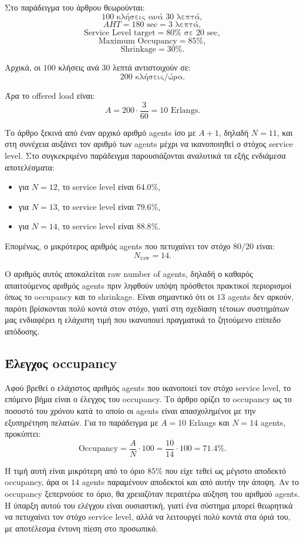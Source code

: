 \documentclass{article}
\begin{document}
Στο παράδειγμα του άρθρου θεωρούνται:
\[
100 \text{ κλήσεις ανά } 30 \text{ λεπτά},
\]
\[
AHT = 180 \text{ sec} = 3 \text{ λεπτά},
\]
\[
\text{Service Level target} = 80\% \text{ σε } 20 \text{ sec},
\]
\[
\text{Maximum Occupancy} = 85\%,
\]
\[
\text{Shrinkage} = 30\%.
\]

Αρχικά, οι $100$ κλήσεις ανά $30$ λεπτά αντιστοιχούν σε:
\[
200 \text{ κλήσεις/ώρα}.
\]

Άρα το offered load είναι:
\[
A = 200 \cdot \frac{3}{60} = 10 \text{ Erlangs}.
\]

Το άρθρο ξεκινά από έναν αρχικό αριθμό agents ίσο με $A+1$, δηλαδή $N=11$, και στη συνέχεια αυξάνει τον αριθμό των agents μέχρι να ικανοποιηθεί ο στόχος service level. Στο συγκεκριμένο παράδειγμα παρουσιάζονται αναλυτικά τα εξής ενδιάμεσα αποτελέσματα:
\begin{itemize}
    \item για $N=12$, το service level είναι $64.0\%$,
    \item για $N=13$, το service level είναι $79.6\%$,
    \item για $N=14$, το service level είναι $88.8\%$.
\end{itemize}

Επομένως, ο μικρότερος αριθμός agents που πετυχαίνει τον στόχο $80/20$ είναι:
\[
\boxed{N_{\text{raw}} = 14}.
\]

Ο αριθμός αυτός αποκαλείται \foreignlanguage{english}{raw number of agents}, δηλαδή ο καθαρός απαιτούμενος αριθμός agents πριν ληφθούν υπόψη πρόσθετοι πρακτικοί περιορισμοί όπως το occupancy και το shrinkage. Είναι σημαντικό ότι οι $13$ agents δεν αρκούν, παρότι βρίσκονται πολύ κοντά στον στόχο, γιατί στη σχεδίαση τέτοιων συστημάτων μας ενδιαφέρει η ελάχιστη τιμή που ικανοποιεί πραγματικά το ζητούμενο επίπεδο απόδοσης.

\subsection{Έλεγχος occupancy}

Αφού βρεθεί ο ελάχιστος αριθμός agents που ικανοποιεί τον στόχο service level, το επόμενο βήμα είναι ο έλεγχος του occupancy. Το άρθρο ορίζει το occupancy ως το ποσοστό του χρόνου κατά το οποίο οι agents είναι απασχολημένοι με την εξυπηρέτηση πελατών. Για το παράδειγμα με $A=10$ Erlangs και $N=14$ agents, προκύπτει:
\[
\text{Occupancy} = \frac{A}{N}\cdot 100
= \frac{10}{14}\cdot 100
= 71.4\%.
\]

Η τιμή αυτή είναι μικρότερη από το όριο $85\%$ που είχε τεθεί ως μέγιστο αποδεκτό occupancy, άρα οι $14$ agents παραμένουν αποδεκτοί και από αυτήν την άποψη. Αν το occupancy ξεπερνούσε το όριο, θα χρειαζόταν περαιτέρω αύξηση του αριθμού agents. Η ύπαρξη αυτού του ελέγχου είναι ουσιαστική, γιατί ένα σύστημα μπορεί θεωρητικά να πετυχαίνει τον στόχο service level, αλλά να λειτουργεί πολύ κοντά στα όριά του, με αποτέλεσμα έντονη πίεση στο προσωπικό.
\end{document}
